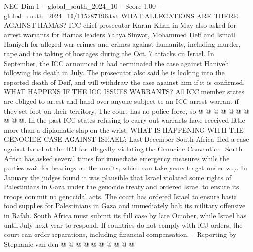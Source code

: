 \begin{textsample}{NEG Dim 1 – global\_south\_2024\_10 – Score 1.00 – global\_south\_2024\_10/115287196.txt}
WHAT ALLEGATIONS ARE THERE AGAINST HAMAS?
ICC chief prosecutor Karim Khan in May also asked for arrest warrants for Hamas leaders Yahya Sinwar, Mohammed Deif and Ismail Haniyeh for alleged war crimes and crimes against humanity, including murder, rape and the taking of hostages during the Oct. 7 attacks on Israel.
In September, the ICC announced it had terminated the case against Haniyeh following his death in July.
The prosecutor also said he is looking into the reported death of Deif, and will withdraw the case against him if it is confirmed.
WHAT HAPPENS IF THE ICC ISSUES WARRANTS?
All ICC member states are obliged to arrest and hand over anyone subject to an ICC arrest warrant if they set foot on their territory.
The court has no police force, so @ @ @ @ @ @ @ @ @ @.
In the past ICC states refusing to carry out warrants have received little more than a diplomatic slap on the wrist.
WHAT IS HAPPENING WITH THE GENOCIDE CASE AGAINST ISRAEL?
Last December South Africa filed a case against Israel at the ICJ for allegedly violating the Genocide Convention.
South Africa has asked several times for immediate emergency measures while the parties wait for hearings on the merits, which can take years to get under way.
In January the judges found it was plausible that Israel violated some rights of Palestinians in Gaza under the genocide treaty and ordered Israel to ensure its troops commit no genocidal acts.
The court has ordered Israel to ensure basic food supplies for Palestinians in Gaza and immediately halt its military offensive in Rafah.
South Africa must submit its full case by late October, while Israel has until July next year to respond.
If countries do not comply with ICJ orders, the court can order reparations, including financial compensation. -- Reporting by Stephanie van den @ @ @ @ @ @ @ @ @ @

\end{textsample}
